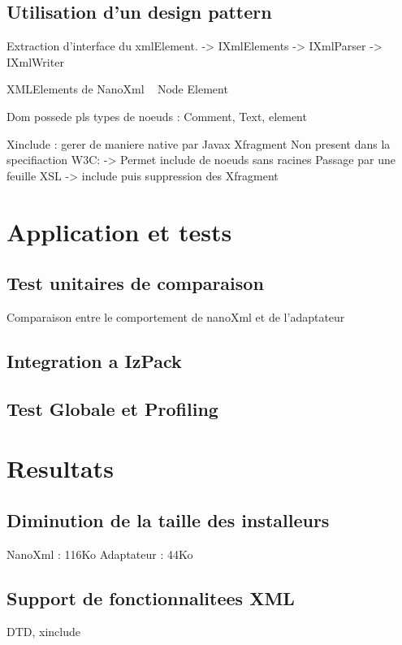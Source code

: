 \subsection{Utilisation d'un design pattern}
Extraction d'interface du xmlElement.
-> IXmlElements
-> IXmlParser
-> IXmlWriter

XMLElements de NanoXml ~ Node Element

Dom possede pls types de noeuds : Comment, Text, element

Xinclude : gerer de maniere native par Javax
Xfragment Non present dans la specifiaction W3C:
-> Permet include de noeuds sans racines
Passage par une feuille XSL
-> include puis suppression des Xfragment
\section{Application et tests}
\subsection{Test unitaires de comparaison}
Comparaison entre le comportement de nanoXml et de l'adaptateur
\subsection{Integration a IzPack}
\subsection{Test Globale et Profiling}

\section{Resultats}
\subsection{Diminution de la taille des installeurs}
NanoXml : 116Ko
Adaptateur : 44Ko
\subsection{Support de fonctionnalitees XML}
DTD, xinclude

